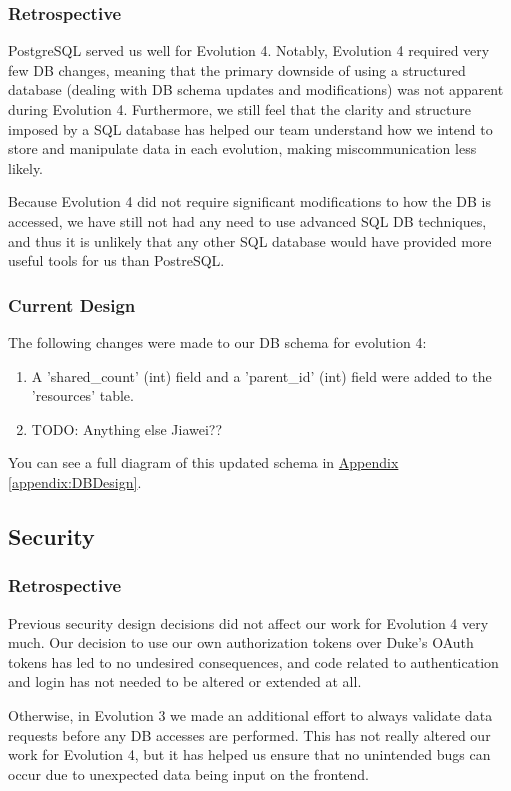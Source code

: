 \documentclass[12pt]{article}
\begin{document}
\subsubsection{Retrospective}
PostgreSQL served us well for Evolution 4. Notably, Evolution 4 required very few DB changes, meaning that the primary downside of using a structured database (dealing with DB schema updates and modifications) was not apparent during Evolution 4. Furthermore, we still feel that the clarity and structure imposed by a SQL database has helped our team understand how we intend to store and manipulate data in each evolution, making miscommunication less likely. 

Because Evolution 4 did not require significant modifications to how the DB is accessed, we have still not had any need to use advanced SQL DB techniques, and thus it is unlikely that any other SQL database would have provided more useful tools for us than PostreSQL. 


\subsubsection{Current Design}
The following changes were made to our DB schema for evolution 4:

\begin{enumerate}
    \item A 'shared\_count' (int) field and a 'parent\_id' (int) field were added to the 'resources' table. 
    \item {\huge TODO: Anything else Jiawei??}
\end{enumerate}

You can see a full diagram of this updated schema in  \hyperref[appendix:DBDesign]{Appendix \ref{appendix:DBDesign}}. 

\subsection{Security}
\subsubsection{Retrospective}
Previous security design decisions did not affect our work for Evolution 4 very much. Our decision to use our own authorization tokens over Duke's OAuth tokens has led to no undesired consequences, and code related to authentication and login has not needed to be altered or extended at all. 

Otherwise, in Evolution 3 we made an additional effort to always validate data requests before any DB accesses are performed. This has not really altered our work for Evolution 4, but it has helped us ensure that no unintended bugs can occur due to unexpected data being input on the frontend. 
\end{document}
